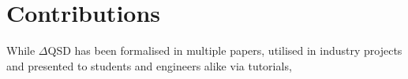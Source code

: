 \section{Contributions}
    While $\Delta$QSD has been formalised in multiple papers, utilised in industry projects and presented to students and engineers alike via tutorials, 
